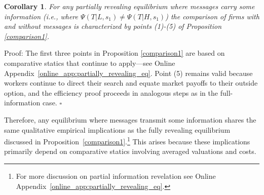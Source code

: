 \documentclass[12pt]{article}
\newtheorem{corollary}[theorem]{Corollary}
\begin{document}
\begin{corollary}
\label{cor:partially revealing} For any partially revealing equilibrium where messages carry some information (i.e., where $\Psi(T|L,s_1) \neq \Psi(T|H,s_1)$) the comparison of firms with and without messages is characterized by points (1)-(5) of Proposition \ref{comparison1}.
\end{corollary}

\noindent Proof: The first three points in Proposition \ref{comparison1} are based on comparative statics that continue to apply—see Online Appendix~\ref{online_app:partially_revealing_eq}. Point (5) remains valid because workers continue to direct their search and equate market payoffs to their outside option, and the efficiency proof proceeds in analogous steps as in the full-information case. $\square $ \bigskip

\noindent Therefore, any equilibrium where messages transmit some information shares the same qualitative empirical implications as the fully revealing equilibrium discussed in Proposition~\ref{comparison1}.\footnote{For more discussion on partial information revelation see Online Appendix~\ref{online_app:partially_revealing_eq}.} This arises because these implications primarily depend on comparative statics involving averaged valuations and costs.
\end{document}
